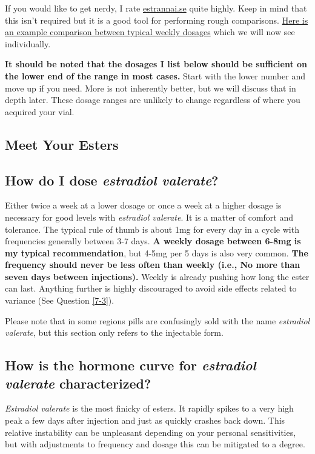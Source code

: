 \documentclass{article}
\begin{document}
If you would like to get nerdy, I rate \href{http://estrannai.se}{estrannai.se} quite highly. Keep in mind that this isn’t required but it is a good tool for performing rough comparisons. \href{https://estrannai.se/\#i0__cu,7,7,1-cu,5,7,3-cu,5,7,2}{Here is an example comparison between typical weekly dosages} which we will now see individually.

\textbf{It should be noted that the dosages I list below should be sufficient on the lower end of the range in most cases.} Start with the lower number and move up if you need. More is not inherently better, but we will discuss that in depth later. These dosage ranges are unlikely to change regardless of where you acquired your vial.

\subsection*{Meet Your Esters}

\subsection{How do I dose \textit{estradiol valerate}?}

Either twice a week at a lower dosage or once a week at a higher dosage is necessary for good levels with \textit{estradiol valerate}. It is a matter of comfort and tolerance. The typical rule of thumb is about 1mg for every day in a cycle with frequencies generally between 3-7 days. \textbf{A weekly dosage between 6-8mg is my typical recommendation}, but 4-5mg per 5 days is also very common. \textbf{The frequency should never be less often than weekly (i.e., No more than seven days between injections).} Weekly is already pushing how long the ester can last. Anything further is highly discouraged to avoid side effects related to variance (See Question \ref{7-3}).

Please note that in some regions pills are confusingly sold with the name \textit{estradiol valerate}, but this section only refers to the injectable form.

\subsection{How is the hormone curve for \textit{estradiol valerate} characterized?}

\textit{Estradiol valerate} is the most finicky of esters. It rapidly spikes to a very high peak a few days after injection and just as quickly crashes back down. This relative instability can be unpleasant depending on your personal sensitivities, but with adjustments to frequency and dosage this can be mitigated to a degree.
\end{document}
